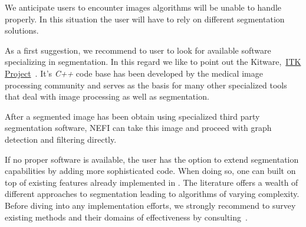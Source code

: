 	We anticipate users to encounter images \NEFIs algorithms will be unable to handle properly. In this situation the user will have to rely on different segmentation solutions. 

	As a first suggestion, we recommend to user to look for available software specializing in segmentation. In this regard we like to point out the Kitware,~\href{http://www.itk.org/itkindex.html}{ITK Project}~\cite{ITKSoftwareGuideThirdEdition}. It's \emph{C++} code base has been developed by the medical image processing community and serves as the basis for many other specialized tools that deal with image processing as well as segmentation. 

	After a segmented image has been obtain using specialized third party segmentation software, NEFI can take this image and proceed with graph detection and filtering directly.

	If no proper software is available, the user has the option to extend \NEFIs segmentation capabilities by adding more sophisticated code. When doing so, one can built on top of existing features already implemented in \NEFI. The literature offers a wealth of different approaches to segmentation leading to algorithms of varying complexity. Before diving into any implementation efforts, we strongly recommend to survey existing methods and their domains of effectiveness by consulting~\cite{chellappa,Pal19931277,pham2000current}.
